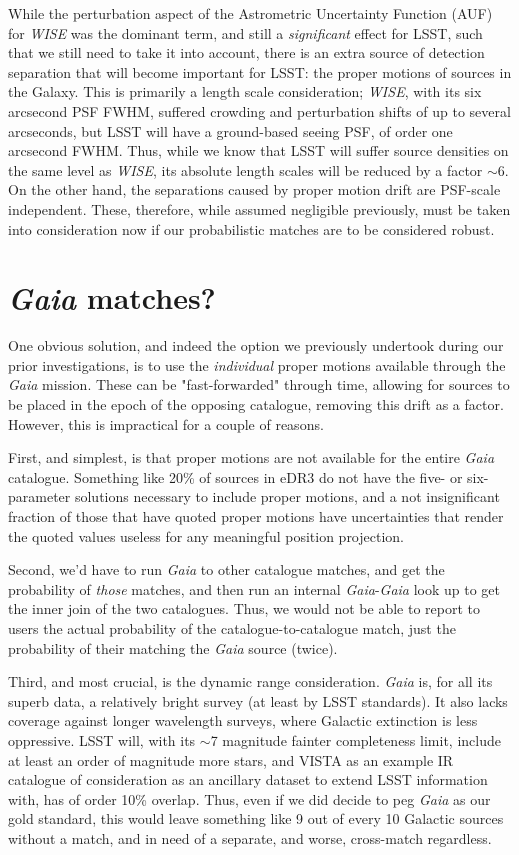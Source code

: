 \documentclass[fleqn,usenatbib]{mnras}
\begin{document}
While the perturbation aspect of the Astrometric Uncertainty Function (AUF) for \textit{WISE} was the dominant term, and still a \textit{significant} effect for LSST, such that we still need to take it into account, there is an extra source of detection separation that will become important for LSST: the proper motions of sources in the Galaxy.
This is primarily a length scale consideration; \textit{WISE}, with its six arcsecond PSF FWHM, suffered crowding and perturbation shifts of up to several arcseconds, but LSST will have a ground-based seeing PSF, of order one arcsecond FWHM.
Thus, while we know that LSST will suffer source densities on the same level as \textit{WISE}, its absolute length scales will be reduced by a factor $\sim$6.
On the other hand, the separations caused by proper motion drift are PSF-scale independent.
These, therefore, while assumed negligible previously, must be taken into consideration now if our probabilistic matches are to be considered robust.

\section{\textit{Gaia} matches?}
One obvious solution, and indeed the option we previously undertook during our prior investigations, is to use the \textit{individual} proper motions available through the \textit{Gaia} mission.
These can be "fast-forwarded" through time, allowing for sources to be placed in the epoch of the opposing catalogue, removing this drift as a factor.
However, this is impractical for a couple of reasons.

First, and simplest, is that proper motions are not available for the entire \textit{Gaia} catalogue.
Something like 20\% of sources in eDR3 do not have the five- or six-parameter solutions necessary to include proper motions, and a not insignificant fraction of those that have quoted proper motions have uncertainties that render the quoted values useless for any meaningful position projection.

Second, we'd have to run \textit{Gaia} to other catalogue matches, and get the probability of \textit{those} matches, and then run an internal \textit{Gaia}-\textit{Gaia} look up to get the inner join of the two catalogues.
Thus, we would not be able to report to users the actual probability of the catalogue-to-catalogue match, just the probability of their matching the \textit{Gaia} source (twice).

Third, and most crucial, is the dynamic range consideration.
\textit{Gaia} is, for all its superb data, a relatively bright survey (at least by LSST standards).
It also lacks coverage against longer wavelength surveys, where Galactic extinction is less oppressive.
LSST will, with its $\sim$7 magnitude fainter completeness limit, include at least an order of magnitude more stars, and VISTA as an example IR catalogue of consideration as an ancillary dataset to extend LSST information with, has of order 10\% overlap.
Thus, even if we did decide to peg \textit{Gaia} as our gold standard, this would leave something like 9 out of every 10 Galactic sources without a match, and in need of a separate, and worse, cross-match regardless.
\end{document}
